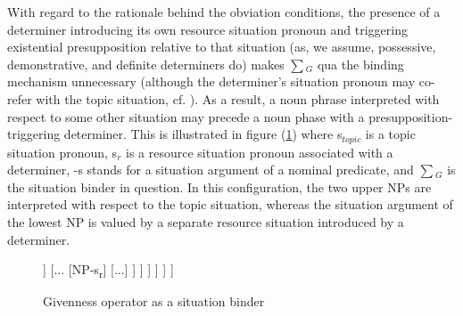 \documentclass[output=paper,modfonts,nonflat]{langsci/langscibook}
\begin{document}
With regard to the rationale behind the obviation conditions, the presence of a determiner introducing its own resource situation pronoun and triggering existential presupposition relative to that situation (as, we assume, possessive, demonstrative, and definite determiners do) makes $\sum$$_{G}$ qua the binding mechanism unnecessary (although the determiner's situation pronoun may co-refer with the topic situation, cf. \citet{Schwarz:2009}). As a result, a noun phrase interpreted with respect to some other situation may precede a noun phase with a presupposition-triggering determiner. This is illustrated in figure (\ref{fig:tree2}) where s$_{topic}$ is a topic situation pronoun, s$_{r}$ is a resource situation pronoun associated with a determiner, -s stands for a situation argument of a nominal predicate, and $\sum$$_{G}$ is the situation binder in question. In this configuration, the two upper NPs are interpreted with respect to the topic situation, whereas the situation argument of the lowest NP is valued by a separate resource situation introduced by a determiner.

\begin{figure}
\begin{forest}
	[...
	[s\textsubscript{topic}] [...
	[Σ\textsubscript{G}] [...
	[NP-s\textsubscript{topic}] [...
	[NP-s\textsubscript{topic}] [...
	[Det [s\textsubscript{r}]] [...
	[NP-s\textsubscript{r}] [...]
	]
	]
	]	
	]
	]
	]
\end{forest}
\caption{Givenness operator as a situation binder}\label{fig:tree2}
\end{figure}


\end{document}

